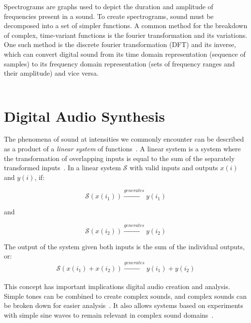 \documentclass[\main/thesis.tex]{subfiles}
\begin{document}
Spectrograms are graphs used to depict the duration and amplitude of frequencies present in a sound. To create spectrograms, sound must be decomposed into a set of simpler functions. A common method for the breakdown of complex, time-variant functions is the fourier transformation and its variations. One such method is the discrete fourier transformation (DFT) and its inverse, which can convert digital sound from its time domain representation (sequence of samples) to its frequency domain representation (sets of frequency ranges and their amplitude) and vice versa.\\\\



\section{Digital Audio Synthesis}
\label{sec_digital_synthesis}
The phenomena of sound at intensities we commonly encounter can be described as a product of a \textit{linear system} of functions~\cite{cook1999chap4}. A linear system is a system where the transformation of overlapping inputs is equal to the sum of the separately transformed inputs~\cite{lyons2004understandingChap1,cook1999chap4}. In a linear system $\mathcal{S}$ with valid inputs and outputs $x(i)$ and $y(i)$, if:

\begin{equation}
 \mathcal{S}(x(i_1)) \xrightarrow{generates} y(i_1)
\end{equation}
\begin{center}
    and
\end{center}
\begin{equation}
\mathcal{S}(x(i_2)) \xrightarrow{generates}y(i_2)
\end{equation}

The output of the system given both inputs is the sum of the individual outputs, or:
\begin{equation}
 \mathcal{S}(x(i_1)+x(i_2)) \xrightarrow{generates} y(i_1)+y(i_2) 
\end{equation}
\\
This concept has important implications digital audio creation and analysis. Simple tones can be combined to create complex sounds, and complex sounds can be broken down for easier analysis~\cite{lyons2004understandingChap1}. It also allows systems based on experiments with simple sine waves to remain relevant in complex sound domains~\cite{cook1999chap4}.
\end{document}
